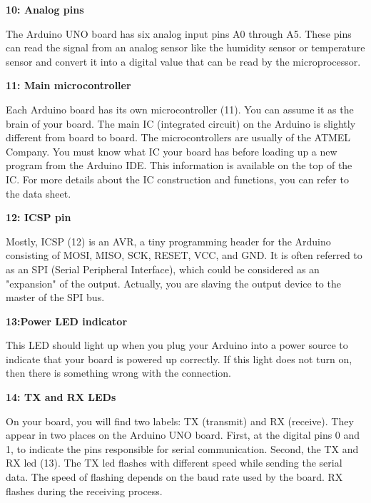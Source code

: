 \textbf{10: Analog pins}\vspace{.3cm}

The Arduino UNO board has six analog input pins A0 through A5. These pins can read the signal from an analog sensor like the humidity sensor or temperature sensor and convert it into a digital value that can be read by the microprocessor.\vspace{.3cm}

\textbf{11: Main microcontroller}\vspace{.3cm}

Each Arduino board has its own microcontroller (11). You can assume it as the brain of your board. The main IC (integrated circuit) on the Arduino is slightly different from board to board. The microcontrollers are usually of the ATMEL Company. You must know what IC your board has before loading up a new program from the Arduino IDE. This information is available on the top of the IC. For more details about the IC construction and functions, you can refer to the data sheet.\vspace{.3cm}

\textbf{12: ICSP pin}\vspace{.3cm}

Mostly, ICSP (12) is an AVR, a tiny programming header for the Arduino consisting of MOSI, MISO, SCK, RESET, VCC, and GND. It is often referred to as an SPI (Serial Peripheral Interface), which could be considered as an "expansion" of the output. Actually, you are slaving the output device to the master of the SPI bus.\vspace{.3cm}

\textbf{13:Power LED indicator}\vspace{.3cm}

This LED should light up when you plug your Arduino into a power source to indicate that your board is powered up correctly. If this light does not turn on, then there is something wrong with the connection.\vspace{.3cm}

\textbf{14: TX and RX LEDs}\vspace{.3cm}

On your board, you will find two labels: TX (transmit) and RX (receive). They appear in two places on the Arduino UNO board. First, at the digital pins 0 and 1, to indicate the pins responsible for serial communication. Second, the TX and RX led (13). The TX led flashes with different speed while sending the serial data. The speed of flashing depends on the baud rate used by the board. RX flashes during the receiving process.\vspace{.3cm}

